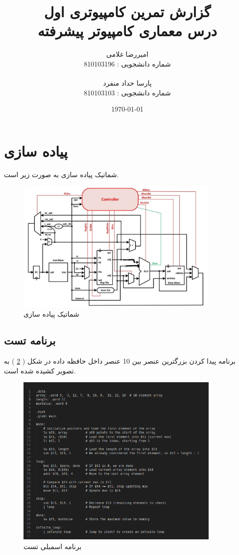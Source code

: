 \documentclass[11pt, a4paper]{article}
\title{گزارش تمرین کامپیوتری اول
	\\
	 درس معماری کامپیوتر پیشرفته}
\author{ امیررضا غلامی\mm \\
	شماره دانشجویی : 810103196 \\
	\\
	پارسا حداد منفرد \\
	شماره دانشجویی : 810103103
}
\date{\today}
\begin{document}
	\maketitle
	\vspace{15cm}
	\tableofcontents
	
	\pagebreak


	\section{پیاده سازی 
		}
		شماتیک پیاده سازی 
		به صورت زیر است.
		\begin{figure}[H]
			\begin{center}
				\includegraphics[width=10cm]{Photos/single_cycle.jpg}
			\end{center}
			\caption{شماتیک پیاده سازی 
			}
			\label{single_cycle}
		\end{figure}
	

		
	\subsection{برنامه تست}
	برنامه پیدا کردن بزرگترین عنصر بین 10 عنصر داخل حافظه داده در شکل (
	\ref{test_asm}
	)
	به تصویر کشیده شده است. 
	\begin{figure}[H]
		\begin{center}
			\includegraphics[width=10cm]{Photos/1.png}
		\end{center}
		\caption{برنامه اسمبلی تست}
		\label{test_asm}
	\end{figure}
	
\end{document}

